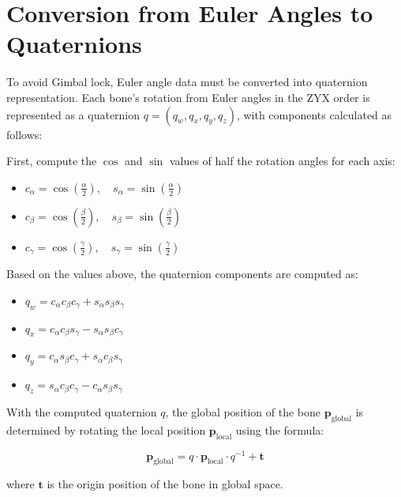 \section{Conversion from Euler Angles to Quaternions}
\label{appendix:BVHData:QuaternionConvert}

To avoid Gimbal lock, Euler angle data must be converted into quaternion representation. Each bone's rotation from Euler angles in the ZYX order is represented as a quaternion $q = (q_w, q_x, q_y, q_z)$, with components calculated as follows:

First, compute the $\cos$ and $\sin$ values of half the rotation angles for each axis:

\begin{itemize}
	\item $c_{\alpha} = \cos\left(\frac{\alpha}{2}\right), \quad s_{\alpha} = \sin\left(\frac{\alpha}{2}\right)$
	\item $c_{\beta} = \cos\left(\frac{\beta}{2}\right), \quad s_{\beta} = \sin\left(\frac{\beta}{2}\right)$
	\item $c_{\gamma} = \cos\left(\frac{\gamma}{2}\right), \quad s_{\gamma} = \sin\left(\frac{\gamma}{2}\right)$
\end{itemize}

Based on the values above, the quaternion components are computed as:

\begin{itemize}
	\item $q_w = c_{\alpha} c_{\beta} c_{\gamma} + s_{\alpha} s_{\beta} s_{\gamma}$
	\item $q_x = c_{\alpha} c_{\beta} s_{\gamma} - s_{\alpha} s_{\beta} c_{\gamma}$
	\item $q_y = c_{\alpha} s_{\beta} c_{\gamma} + s_{\alpha} c_{\beta} s_{\gamma}$
	\item $q_z = s_{\alpha} c_{\beta} c_{\gamma} - c_{\alpha} s_{\beta} s_{\gamma}$
\end{itemize}

With the computed quaternion $q$, the global position of the bone $\mathbf{p}_{\text{global}}$ is determined by rotating the local position $\mathbf{p}_{\text{local}}$ using the formula:

\begin{equation}
	\mathbf{p}_{\text{global}} = q \cdot \mathbf{p}_{\text{local}} \cdot q^{-1} + \mathbf{t}
\end{equation}

where $\mathbf{t}$ is the origin position of the bone in global space.
